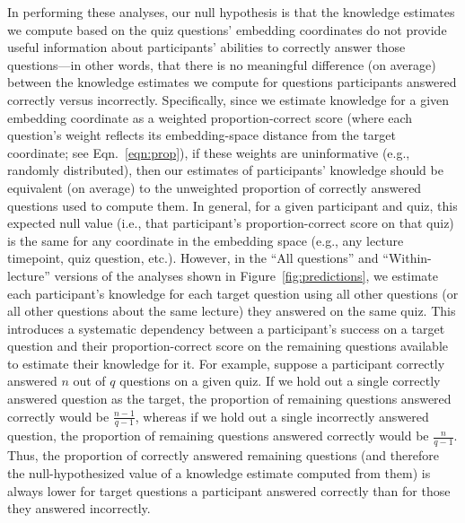 \documentclass[10pt]{article}
\begin{document}
In performing these analyses, our null hypothesis is that the knowledge
estimates we compute based on the quiz questions' embedding coordinates do
not provide useful information about participants' abilities to correctly answer
those questions---in other words, that there is no meaningful difference (on
average) between the knowledge estimates we compute for questions participants
answered correctly versus incorrectly. Specifically, since we
estimate knowledge for a given embedding coordinate as a weighted
proportion-correct score (where each question's weight reflects its
embedding-space distance from the target coordinate; see Eqn.~\ref{eqn:prop}),
if these weights are uninformative (e.g., randomly distributed), then our
estimates of participants' knowledge should be equivalent (on average) to the
unweighted proportion of correctly answered questions used to compute
them. In general, for a given participant and quiz, this expected null value (i.e.,
that participant's proportion-correct score on that quiz) is the same for any
coordinate in the embedding space (e.g., any lecture timepoint, quiz question,
etc.). However, in the ``All questions'' and ``Within-lecture'' versions of the
analyses shown in Figure~\ref{fig:predictions}, we estimate each participant's
knowledge for each target question using all other questions (or all
other questions about the same lecture) they answered on the same quiz.
This introduces a systematic dependency between a participant's success on a
target question and their proportion-correct score on the remaining questions
available to estimate their knowledge for it. For example, suppose a participant
correctly answered $n$ out of $q$ questions on a given quiz. If we hold out a
single correctly answered question as the target, the proportion of
remaining questions answered correctly would be $\frac{n - 1}{q - 1}$, whereas
if we hold out a single incorrectly answered question, the proportion
of remaining questions answered correctly would be $\frac{n}{q - 1}$. Thus, the
proportion of correctly answered remaining questions (and therefore the
null-hypothesized value of a knowledge estimate computed from them) is always
lower for target questions a participant answered correctly than for
those they answered incorrectly.
\end{document}
